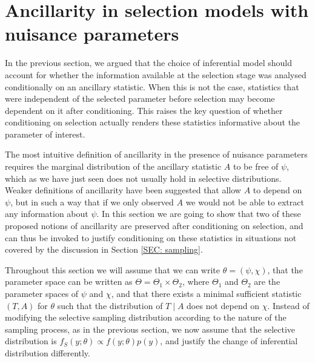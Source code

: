 \documentclass[pdflatex,sn-chicago]{sn-jnl}%
\theoremstyle{thmstyleone}%
\theoremstyle{thmstyletwo}%
\theoremstyle{thmstylethree}%
\begin{document}
\section{Ancillarity in selection models with nuisance parameters}

In the previous section, we argued that the choice of inferential model should account for whether the information available at the selection stage was analysed conditionally on an ancillary statistic. When this is not the case, statistics that were independent of the selected parameter before selection may become dependent on it after conditioning. This raises the key question of whether conditioning on selection actually renders these statistics informative about the parameter of interest.

The most intuitive definition of ancillarity in the presence of nuisance parameters requires the marginal distribution of the ancillary statistic $A$ to be free of $\psi$, which as we have just seen does not usually hold in selective distributions. Weaker definitions of ancillarity have been suggested that allow $A$ to depend on $\psi$, but in such a way that if we only observed $A$ we would not be able to extract any information about $\psi$. In this section we are going to show that two of these proposed notions of ancillarity are preserved after conditioning on selection, and can thus be invoked to justify conditioning on these statistics in situations not covered by the discussion in Section \ref{SEC: sampling}.

Throughout this section we will assume that we can write $\theta = (\psi, \chi)$, that the parameter space can be written as $\Theta = \Theta_1 \times \Theta_2$, where $\Theta_1$ and $\Theta_2$ are the parameter spaces of $\psi$ and $\chi$, and that there exists a minimal sufficient statistic $(T, A)$ for $\theta$ such that the distribution of $T\mid A$ does not depend on $\chi$. Instead of modifying the selective sampling distribution according to the nature of the sampling process, as in the previous section, we now assume that the selective distribution is $f_S(y; \theta)\propto f(y; \theta) p(y)$, and justify the change of inferential distribution differently.
\end{document}

